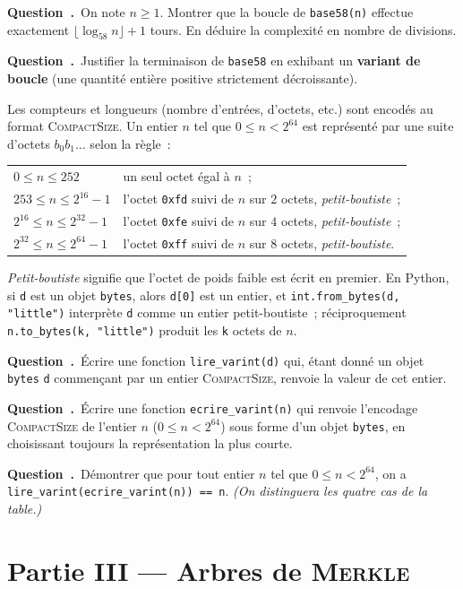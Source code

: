 \documentclass[11pt,a4paper]{article}
\newcounter{qcnt}
\newcommand{\Q}{\medskip\par\stepcounter{qcnt}\noindent\textbf{Question~\theqcnt.}~}
\newcommand{\code}[1]{\lstinline!#1!}
\begin{document}
\Q On note $n\ge 1$. Montrer que la boucle de \code{base58(n)} effectue exactement $\lfloor \log_{58} n\rfloor + 1$ tours. En déduire la complexité en nombre de divisions.

\Q Justifier la terminaison de \code{base58} en exhibant un \textbf{variant de boucle} (une quantité entière positive strictement décroissante).

\medskip
Les compteurs et longueurs (nombre d'entrées, d'octets, etc.) sont encodés au format \textsc{CompactSize}. Un entier $n$ tel que $0\le n < 2^{64}$ est représenté par une suite d'octets $b_0 b_1\ldots$ selon la règle~:
\begin{center}
\begin{tabular}{ll}
$0 \le n \le 252$ & un seul octet égal à $n$~;\\
$253 \le n \le 2^{16}-1$ & l'octet \code{0xfd} suivi de $n$ sur $2$ octets, \emph{petit-boutiste}~;\\
$2^{16} \le n \le 2^{32}-1$ & l'octet \code{0xfe} suivi de $n$ sur $4$ octets, \emph{petit-boutiste}~;\\
$2^{32} \le n \le 2^{64}-1$ & l'octet \code{0xff} suivi de $n$ sur $8$ octets, \emph{petit-boutiste}.\\
\end{tabular}
\end{center}
\emph{Petit-boutiste} signifie que l'octet de poids faible est écrit en premier. En Python, si \code{d} est un objet \code{bytes}, alors \code{d[0]} est un entier, et \code{int.from_bytes(d, "little")} interprète \code{d} comme un entier petit-boutiste~; réciproquement \code{n.to_bytes(k, "little")} produit les \code{k} octets de $n$.

\Q Écrire une fonction \code{lire_varint(d)} qui, étant donné un objet \code{bytes} \code{d} commençant par un entier \textsc{CompactSize}, renvoie la valeur de cet entier.

\Q Écrire une fonction \code{ecrire_varint(n)} qui renvoie l'encodage \textsc{CompactSize} de l'entier $n$ ($0\le n<2^{64}$) sous forme d'un objet \code{bytes}, en choisissant toujours la représentation la plus courte.

\Q Démontrer que pour tout entier $n$ tel que $0\le n<2^{64}$, on a \code{lire_varint(ecrire_varint(n)) == n}. \emph{(On distinguera les quatre cas de la table.)}

\section*{Partie III --- Arbres de \textsc{Merkle}}
\end{document}
